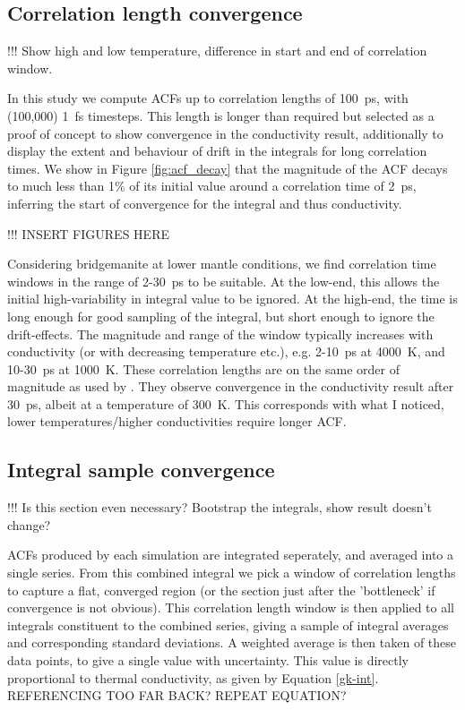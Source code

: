 \subsection{\label{sec:3.GK.cor}Correlation length convergence}

!!! Show high and low temperature, difference in start and end of correlation window.

In this study we compute ACFs up to correlation lengths of 100~ps, with (100,000) 1~fs timesteps. This length is longer than required but selected as a proof of concept to show convergence in the conductivity result, additionally to display the extent and behaviour of drift in the integrals for long correlation times. We show in Figure \ref{fig:acf_decay} that the magnitude of the ACF decays to much less than 1\% of its initial value around a correlation time of 2~ps, inferring the start of convergence for the integral and thus conductivity.

!!! INSERT FIGURES HERE

Considering bridgemanite at lower mantle conditions, we find correlation time windows in the range of 2-30~ps to be suitable. At the low-end, this allows the initial high-variability in integral value to be ignored. At the high-end, the time is long enough for good sampling of the integral, but short enough to ignore the drift-effects. The magnitude and range of the window typically increases with conductivity (or with decreasing temperature etc.), e.g. 2-10~ps at 4000~K, and 10-30~ps at 1000~K. These correlation lengths are on the same order of magnitude as used by \citet{Haigis2012}. They observe convergence in the conductivity result after 30~ps, albeit at a temperature of 300~K. This corresponds with what I noticed, lower temperatures/higher conductivities require longer ACF.

\subsection{\label{sec:3.GK.int}Integral sample convergence}

!!! Is this section even necessary? Bootstrap the integrals, show result doesn't change?

ACFs produced by each simulation are integrated seperately, and averaged into a single series. 
From this combined integral we pick a window of correlation lengths to capture a flat, converged region (or the section just after the 'bottleneck' if convergence is not obvious). This correlation length window is then applied to all integrals constituent to the combined series, giving a sample of integral averages and corresponding standard deviations. A weighted average is then taken of these data points, to give a single value with uncertainty. This value is directly proportional to thermal conductivity, as given by Equation \ref{gk-int}. REFERENCING TOO FAR BACK? REPEAT EQUATION?

